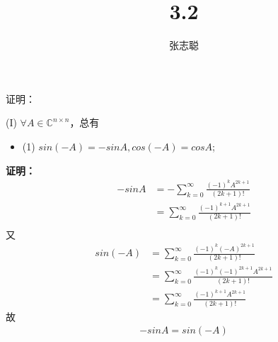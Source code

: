 \documentclass{article}
\begin{document}
\title{3.2}
\author{张志聪}
\maketitle

\begin{zremark}
  证明：

  (I) $\forall A \in \mathbb{C}^{n \times n}$，总有
  \begin{itemize}
    \item (1) $sin (-A) = -sin A, cos(-A) = cos A$;
  \end{itemize}
\end{zremark}

\textbf{证明：}
\begin{align*}
  - sin A
   & = - \sum\limits_{k = 0}^\infty \frac{(-1)^k A^{2k + 1}}{(2k + 1)!}   \\
   & = \sum\limits_{k = 0}^\infty \frac{(-1)^{k+1} A^{2k + 1}}{(2k + 1)!} \\
\end{align*}
又
\begin{align*}
  sin (-A)
   & = \sum\limits_{k = 0}^\infty \frac{(-1)^k (-A)^{2k + 1}}{(2k + 1)!}           \\
   & = \sum\limits_{k = 0}^\infty \frac{(-1)^k (-1)^{2k + 1}A^{2k + 1}}{(2k + 1)!} \\
   & = \sum\limits_{k = 0}^\infty \frac{(-1)^{k + 1}A^{2k + 1}}{(2k + 1)!}         
\end{align*}
故
\begin{align*}
  -sin A = sin (-A)
\end{align*}
\end{document}
